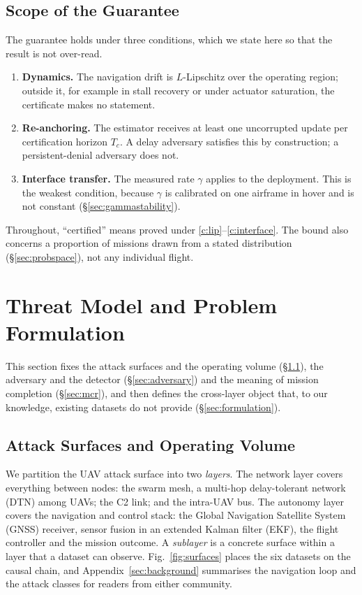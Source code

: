 \documentclass[conference,letterpaper,10pt]{IEEEtran}   %
\newcommand{\layernet}{network}
\newcommand{\layerauto}{autonomy}
\begin{document}
\subsection*{Scope of the Guarantee}
\label{sec:scope}
The guarantee holds under three conditions, which we state here so that the
result is not over-read.
\begin{enumerate}[label=(C\arabic*),leftmargin=2.6em]
\item\label{c:lip} \textbf{Dynamics.} The navigation drift is $L$-Lipschitz over
the operating region; outside it, for example in stall recovery or under
actuator saturation, the certificate makes no statement.
\item\label{c:anchor} \textbf{Re-anchoring.} The estimator receives at least one
uncorrupted update per certification horizon $T_c$. A delay adversary satisfies
this by construction; a persistent-denial adversary does not.
\item\label{c:interface} \textbf{Interface transfer.} The measured rate $\gamma$
applies to the deployment. This is the weakest condition, because $\gamma$ is
calibrated on one airframe in hover and is not constant
(\S\ref{sec:gammastability}).
\end{enumerate}
Throughout, ``certified'' means proved under \ref{c:lip}--\ref{c:interface}. The
bound also concerns a proportion of missions drawn from a stated distribution
(\S\ref{sec:probspace}), not any individual flight.

\section{Threat Model and Problem Formulation}
\label{sec:problem}
This section fixes the attack surfaces and the operating volume
(\S\ref{sec:surfaces}), the adversary and the detector (\S\ref{sec:adversary})
and the meaning of mission completion (\S\ref{sec:mcr}), and then defines the
cross-layer object that, to our knowledge, existing datasets do not provide
(\S\ref{sec:formulation}).

\subsection{Attack Surfaces and Operating Volume}
\label{sec:surfaces}
We partition the UAV attack surface into two \emph{layers}. The \layernet{}
layer covers everything between nodes: the swarm mesh, a multi-hop
delay-tolerant network (DTN) among UAVs; the C2 link; and the intra-UAV bus. The
\layerauto{} layer covers the navigation and control stack: the Global
Navigation Satellite System (GNSS) receiver, sensor fusion in an extended Kalman
filter (EKF), the flight controller and the mission outcome. A \emph{sublayer} is a concrete surface
within a layer that a dataset can observe. Fig.~\ref{fig:surfaces} places the
six datasets on the causal chain, and Appendix~\ref{sec:background} summarises
the navigation loop and the attack classes for readers from either community.
\end{document}
